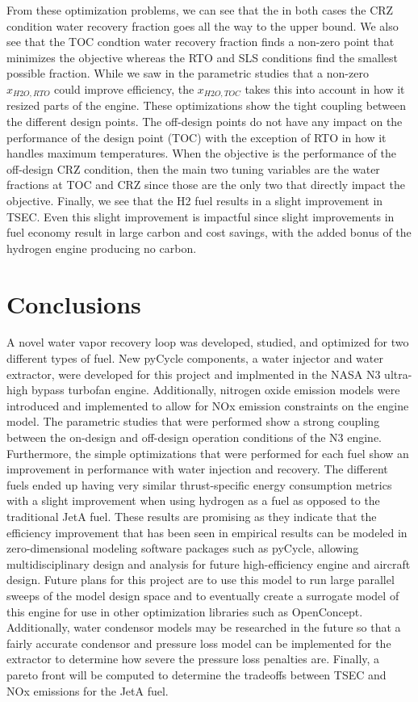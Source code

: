 \documentclass[12pt]{article}
\begin{document}
\noindent
From these optimization problems, we can see that the in both cases the CRZ condition water recovery fraction goes all the way to the upper bound.
We also see that the TOC condtion water recovery fraction finds a non-zero point that minimizes the objective whereas the RTO and SLS conditions find the smallest possible fraction.
While we saw in the parametric studies that a non-zero $x_{H2O,RTO}$ could improve efficiency, the $x_{H2O,TOC}$ takes this into account in how it resized parts of the engine.
These optimizations show the tight coupling between the different design points.
The off-design points do not have any impact on the performance of the design point (TOC) with the exception of RTO in how it handles maximum temperatures.
When the objective is the performance of the off-design CRZ condition, then the main two tuning variables are the water fractions at TOC and CRZ since those are the only two that directly impact the objective.
Finally, we see that the H2 fuel results in a slight improvement in TSEC.
Even this slight improvement is impactful since slight improvements in fuel economy result in large carbon and cost savings, with the added bonus of the hydrogen engine producing no carbon.

\section{Conclusions}
A novel water vapor recovery loop was developed, studied, and optimized for two different types of fuel.
New pyCycle components, a water injector and water extractor, were developed for this project and implmented in the NASA N3 ultra-high bypass turbofan engine.
Additionally, nitrogen oxide emission models were introduced and implemented to allow for NOx emission constraints on the engine model.
The parametric studies that were performed show a strong coupling between the on-design and off-design operation conditions of the N3 engine.
Furthermore, the simple optimizations that were performed for each fuel show an improvement in performance with water injection and recovery.
The different fuels ended up having very similar thrust-specific energy consumption metrics with a slight improvement when using hydrogen as a fuel as opposed to the traditional JetA fuel.
These results are promising as they indicate that the efficiency improvement that has been seen in empirical results can be modeled in zero-dimensional modeling software packages such as pyCycle, allowing multidisciplinary design and analysis for future high-efficiency engine and aircraft design.
Future plans for this project are to use this model to run large parallel sweeps of the model design space and to eventually create a surrogate model of this engine for use in other optimization libraries such as OpenConcept.
Additionally, water condensor models may be researched in the future so that a fairly accurate condensor and pressure loss model can be implemented for the extractor to determine how severe the pressure loss penalties are.
Finally, a pareto front will be computed to determine the tradeoffs between TSEC and NOx emissions for the JetA fuel.
\end{document}
